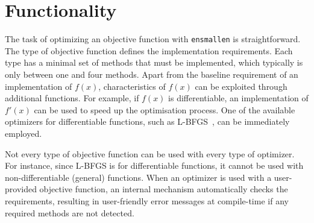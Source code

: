 \documentclass[twoside,11pt]{article}
\begin{document}

\section{Functionality}

The task of optimizing an objective function with {\tt ensmallen} is straightforward.
The type of objective function defines the implementation requirements.
Each type has a minimal set of methods that must be implemented,
which typically is only between one and four methods.
Apart from the baseline requirement of an implementation of $f(x)$,
characteristics of $f(x)$ can be exploited through additional functions.
For example, if $f(x)$ is differentiable,
an implementation of $f'(x)$ can be used to speed up the optimisation process.
One of the available optimizers for differentiable functions,
such as L-BFGS~\citep{liu1989limited},
can be immediately employed.

Not every type of objective function can be used with every type of optimizer.
For instance, since L-BFGS is for differentiable functions,
it cannot be used with non-differentiable (general) functions.
When an optimizer is used with a user-provided objective function,
an internal mechanism automatically checks the requirements,
resulting in user-friendly error messages at compile-time if any required methods are not detected.
\end{document}
